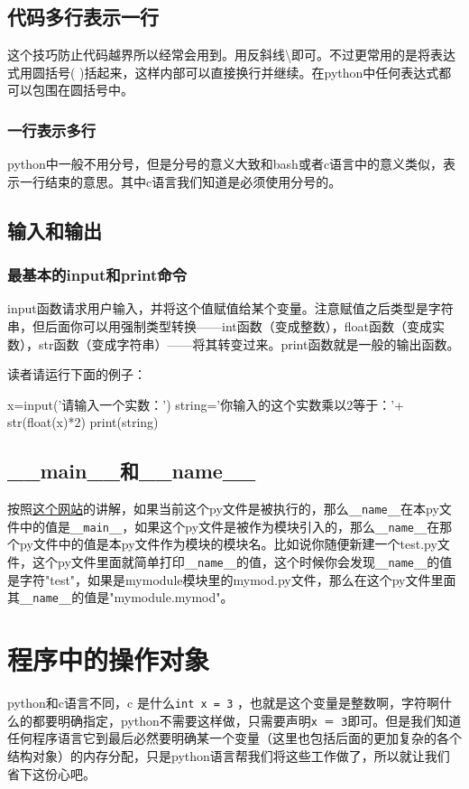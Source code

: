 \documentclass[12pt,oneside]{book}
\begin{document}
\begin{common-format}
\section{代码多行表示一行}
这个技巧防止代码越界所以经常会用到。用反斜线\textbackslash 即可。不过更常用的是将表达式用圆括号( )括起来，这样内部可以直接换行并继续。在python中任何表达式都可以包围在圆括号中。

\subsection{一行表示多行}
python中一般不用分号，但是分号的意义大致和bash或者c语言中的意义类似，表示一行结束的意思。其中c语言我们知道是必须使用分号的。



\section{输入和输出}
\subsection{最基本的input和print命令}
input函数请求用户输入，并将这个值赋值给某个变量。注意赋值之后类型是字符串，但后面你可以用强制类型转换——int函数（变成整数），float函数（变成实数），str函数（变成字符串）——将其转变过来。print函数就是一般的输出函数。

读者请运行下面的例子：
\begin{tcbpython}[]
x=input('请输入一个实数：')
string='你输入的这个实数乘以2等于：'+ str(float(x)*2)
print(string)
\end{tcbpython}


\section{\_{}\_{}main\_{}\_{}和\_{}\_{}name\_{}\_{}}
按照\href{http://stackoverflow.com/questions/419163/what-does-if-name-main-do}{这个网站}的讲解，如果当前这个py文件是被执行的，那么\verb+__name__+在本py文件中的值是\verb+__main__+，如果这个py文件是被作为模块引入的，那么\verb+__name__+在那个py文件中的值是本py文件作为模块的模块名。比如说你随便新建一个test.py文件，这个py文件里面就简单打印\verb+__name__+的值，这个时候你会发现\verb+__name__+的值是字符"test"，如果是mymodule模块里的mymod.py文件，那么在这个py文件里面其\verb+__name__+的值是"mymodule.mymod"。



\chapter{程序中的操作对象}
python和c语言不同，c 是什么\verb+int x = 3+ ，也就是这个变量是整数啊，字符啊什么的都要明确指定，python不需要这样做，只需要声明\verb+x ＝ 3+即可。但是我们知道任何程序语言它到最后必然要明确某一个变量（这里也包括后面的更加复杂的各个结构对象）的内存分配，只是python语言帮我们将这些工作做了，所以就让我们省下这份心吧。


\end{common-format}
\end{document}
